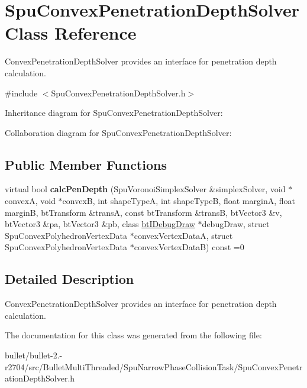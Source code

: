 \hypertarget{class_spu_convex_penetration_depth_solver}{\section{Spu\+Convex\+Penetration\+Depth\+Solver Class Reference}
\label{class_spu_convex_penetration_depth_solver}
}


Convex\+Penetration\+Depth\+Solver provides an interface for penetration depth calculation.  




{\ttfamily \#include $<$Spu\+Convex\+Penetration\+Depth\+Solver.\+h$>$}



Inheritance diagram for Spu\+Convex\+Penetration\+Depth\+Solver\+:


Collaboration diagram for Spu\+Convex\+Penetration\+Depth\+Solver\+:
\subsection*{Public Member Functions}
\begin{DoxyCompactItemize}
\item 
\hypertarget{class_spu_convex_penetration_depth_solver_a4be745e722674110fbd480a2b3503d6f}{virtual bool {\bfseries calc\+Pen\+Depth} (Spu\+Voronoi\+Simplex\+Solver \&simplex\+Solver, void $\ast$convex\+A, void $\ast$convex\+B, int shape\+Type\+A, int shape\+Type\+B, float margin\+A, float margin\+B, bt\+Transform \&trans\+A, const bt\+Transform \&trans\+B, bt\+Vector3 \&v, bt\+Vector3 \&pa, bt\+Vector3 \&pb, class \hyperlink{classbt_i_debug_draw}{bt\+I\+Debug\+Draw} $\ast$debug\+Draw, struct Spu\+Convex\+Polyhedron\+Vertex\+Data $\ast$convex\+Vertex\+Data\+A, struct Spu\+Convex\+Polyhedron\+Vertex\+Data $\ast$convex\+Vertex\+Data\+B) const =0}\label{class_spu_convex_penetration_depth_solver_a4be745e722674110fbd480a2b3503d6f}

\end{DoxyCompactItemize}


\subsection{Detailed Description}
Convex\+Penetration\+Depth\+Solver provides an interface for penetration depth calculation. 

The documentation for this class was generated from the following file\+:\begin{DoxyCompactItemize}
\item 
bullet/bullet-\/2.-\/r2704/src/\+Bullet\+Multi\+Threaded/\+Spu\+Narrow\+Phase\+Collision\+Task/Spu\+Convex\+Penetration\+Depth\+Solver.\+h\end{DoxyCompactItemize}
